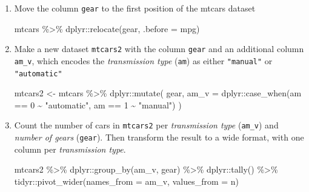 \documentclass[
  letterpaper,
]{book}
\newenvironment{Shaded}{}{}
\newcommand{\AttributeTok}[1]{\textcolor[rgb]{0.84,0.23,0.29}{#1}}
\newcommand{\DecValTok}[1]{\textcolor[rgb]{0.00,0.36,0.77}{#1}}
\newcommand{\FunctionTok}[1]{\textcolor[rgb]{0.44,0.26,0.76}{#1}}
\newcommand{\NormalTok}[1]{\textcolor[rgb]{0.14,0.16,0.18}{#1}}
\newcommand{\OtherTok}[1]{\textcolor[rgb]{0.44,0.26,0.76}{#1}}
\newcommand{\SpecialCharTok}[1]{\textcolor[rgb]{0.00,0.36,0.77}{#1}}
\newcommand{\StringTok}[1]{\textcolor[rgb]{0.01,0.18,0.38}{#1}}
\begin{document}
\begin{enumerate}
\def\labelenumi{\arabic{enumi}.}
\item
  Move the column \texttt{gear} to the first position of the mtcars
  dataset

\begin{Shaded}
\begin{Highlighting}[]
\NormalTok{mtcars }\SpecialCharTok{\%\textgreater{}\%}\NormalTok{ dplyr}\SpecialCharTok{::}\FunctionTok{relocate}\NormalTok{(gear, }\AttributeTok{.before =}\NormalTok{ mpg)}
\end{Highlighting}
\end{Shaded}
\item
  Make a new dataset \texttt{mtcars2} with the column \texttt{gear} and
  an additional column \texttt{am\_v}, which encodes the
  \emph{transmission type} (\texttt{am}) as either \texttt{"manual"} or
  \texttt{"automatic"}

\begin{Shaded}
\begin{Highlighting}[]
\NormalTok{mtcars2 }\OtherTok{\textless{}{-}}\NormalTok{ mtcars }\SpecialCharTok{\%\textgreater{}\%}\NormalTok{ dplyr}\SpecialCharTok{::}\FunctionTok{mutate}\NormalTok{(}
\NormalTok{gear, }\AttributeTok{am\_v =}\NormalTok{ dplyr}\SpecialCharTok{::}\FunctionTok{case\_when}\NormalTok{(am }\SpecialCharTok{==} \DecValTok{0} \SpecialCharTok{\textasciitilde{}} \StringTok{"automatic"}\NormalTok{, am }\SpecialCharTok{==} \DecValTok{1} \SpecialCharTok{\textasciitilde{}} \StringTok{"manual"}\NormalTok{)}
\NormalTok{)}
\end{Highlighting}
\end{Shaded}
\item
  Count the number of cars in \texttt{mtcars2} per \emph{transmission
  type} (\texttt{am\_v}) and \emph{number of gears} (\texttt{gear}).
  Then transform the result to a wide format, with one column per
  \emph{transmission type}.

\begin{Shaded}
\begin{Highlighting}[]
\NormalTok{mtcars2 }\SpecialCharTok{\%\textgreater{}\%}\NormalTok{ dplyr}\SpecialCharTok{::}\FunctionTok{group\_by}\NormalTok{(am\_v, gear) }\SpecialCharTok{\%\textgreater{}\%}\NormalTok{ dplyr}\SpecialCharTok{::}\FunctionTok{tally}\NormalTok{() }\SpecialCharTok{\%\textgreater{}\%}
\NormalTok{tidyr}\SpecialCharTok{::}\FunctionTok{pivot\_wider}\NormalTok{(}\AttributeTok{names\_from =}\NormalTok{ am\_v, }\AttributeTok{values\_from =}\NormalTok{ n)}
\end{Highlighting}
\end{Shaded}
\end{enumerate}
\end{document}
